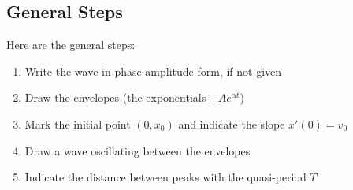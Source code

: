 \documentclass[10pt,letterpaper]{article}
\begin{document}
\subsection{General Steps}
Here are the general steps:
\begin{enumerate}
    \item Write the wave in phase-amplitude form, if not given
    \item Draw the envelopes (the exponentials $\pm Ae^{\alpha t}$)
    \item Mark the initial point $(0,x_0)$ and indicate the slope $x'(0)=v_0$ 
    \item Draw a wave oscillating between the envelopes
    \item Indicate the distance between peaks with the quasi-period $T$
\end{enumerate}
\end{document}
